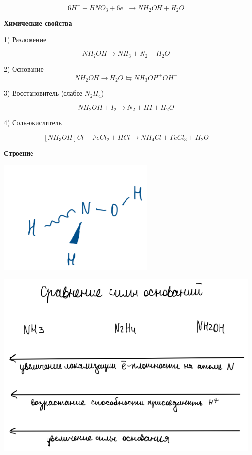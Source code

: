 $$6H^+ + HNO_3 + 6e^- \rightarrow NH_2OH + H_2O$$

\textbf{Химические свойства}

1) Разложение 

$$NH_2OH \rightarrow NH_3 + N_2 +H_2O$$

2) Основание 
$$NH_2OH \rightarrow H_2O \leftrightarrows NH_3OH^+ OH^-$$

3) Восстановитель (слабее $N_2H_4$)

$$NH_2OH + I_2 \rightarrow N_2 + HI + H_2O$$

4) Соль-окислитель

$$[NH_3OH]Cl + FeCl_2 + HCl \rightarrow NH_4Cl + FeCl_3 + H_2O$$

\textbf{Строение}

\includegraphics{images/8v13.png}

\includegraphics{images/8v14.png}
